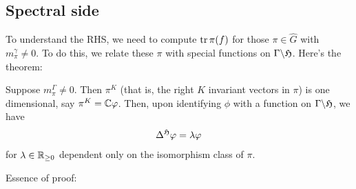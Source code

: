 \documentclass[11pt]{amsart}
\newcommand{\lmod}{\backslash}
\begin{document}
\subsection{Spectral side}
To understand the RHS, we need to compute $\operatorname{tr} \pi (f)$ for those $\pi \in \hat{G}$ with $m_{\pi}^{\gamma}\neq 0$. To do this, we relate these $\pi$ with special functions on $\Gamma \lmod \half$.  Here's the theorem:
\begin{thm}
	Suppose $m_{\pi}^{\Gamma}\neq 0$. Then $\pi^{K}$  (that is, the right $K$ invariant vectors in $\pi$) is one dimensional, say $\pi^{K}=\mathbb{C}\varphi$. Then, upon identifying $\phi$ with a function on $\Gamma \lmod \half$, we have
		\begin{align*}
			\Delta^{\mathfrak{H}} \varphi = \lambda \varphi
		\end{align*}
	for $\lambda \in \mathbb{R}_{\geq 0}$ dependent only on the isomorphism class of $\pi$. 
\end{thm} 
	Essence of proof:  
\end{document}
